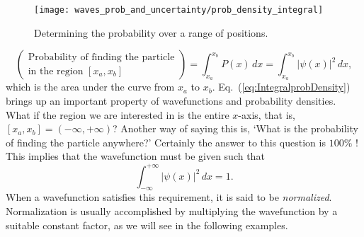 \begin{figure}
\begin{center}
\texttt{[image: waves\_prob\_and\_uncertainty/prob\_density\_integral]}
\end{center}
\caption{Determining the probability over a range of positions.}
\label{fig:prob_density_integral}
\end{figure}

\begin{equation}
\label{eq:IntegralprobDensity}
\left( \begin{array}{l}
         \mbox{Probability of finding the particle} \\
         \mbox{in the region $[x_a, x_b]$}
                    \end{array} \right) = \int_{x_a}^{x_b} P(x)\, dx
                                        = \int_{x_a}^{x_b} |\psi(x)|^2\, dx ,
\end{equation}
which is the area under the curve from $x_a$ to $x_b$.
Eq.~(\ref{eq:IntegralprobDensity}) brings up an important property of
wavefunctions and probability densities.  What if the region we are
interested in is the entire $x$-axis, that is, $[x_a, x_b] = (-\infty,
+\infty)$?  Another way of saying this is, `What is the probability of
finding the particle anywhere?'  Certainly the answer to this question
is $100\%$ !  This implies that the wavefunction must be given such that
\begin{equation}
\label{eq:normalization}
\int_{-\infty}^{+\infty} |\psi(x)|^2\, dx = 1 .
\end{equation}
When a wavefunction satisfies this requirement, it is said to be {\em
  normalized}.  Normalization is usually accomplished by multiplying
the wavefunction by a suitable constant factor, as we will see in the
following examples.

